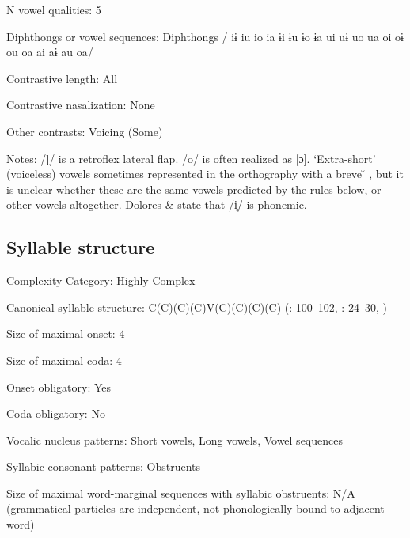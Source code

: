 {\begin{appendixdesc}
\item[N vowel qualities:] 5

\item[Diphthongs or vowel sequences:] Diphthongs / iɨ iu io ia ɨi ɨu ɨo ɨa ui uɨ uo ua oi oɨ ou oa ai aɨ au oa/

\item[Contrastive length:] All

\item[Contrastive nasalization:] None

\item[Other contrasts:] Voicing (Some)

\item[Notes:] /ɭ/ is a retroflex lateral flap. /o/ is often realized as [ɔ]. ‘Extra-short’ (voiceless) vowels sometimes represented in the orthography with a breve  \u{} , but it is unclear whether these are the same vowels predicted by the rules below, or other vowels altogether. Dolores \& \citet[236]{Mathiot1991} state that /i̥/ is phonemic.
\end{appendixdesc}
\subsection*{Syllable structure}
\begin{appendixdesc}

\item[Complexity Category:] Highly Complex

\item[Canonical syllable structure:] C(C)(C)(C)V(C)(C)(C)(C) (\citealt{Saxton1982}: 100--102, \citealt{Hale1959}: 24--30, \citealt{HillZepeda1992})

\item[Size of maximal onset:] 4

\item[Size of maximal coda:] 4

\item[Onset obligatory:] Yes

\item[Coda obligatory:] No

\item[Vocalic nucleus patterns:] Short vowels, Long vowels, Vowel sequences

\item[Syllabic consonant patterns:] Obstruents

\item[Size of maximal word-marginal sequences with syllabic obstruents:] N/A (grammatical particles are independent, not phonologically bound to adjacent word)


\end{appendixdesc}}
